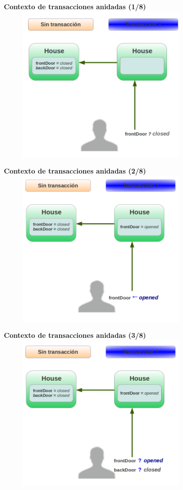 \begin{enumerate}
	{\bf Contexto de transacciones anidadas (1/8)}\\
	\includegraphics[width=400px, height=300px]{img/contextoAninado1}
	
	{\bf Contexto de transacciones anidadas (2/8)}\\
	\includegraphics[width=400px, height=300px]{img/contextoAninado2}
	
	{\bf Contexto de transacciones anidadas (3/8)}\\
	\includegraphics[width=400px, height=300px]{img/contextoAninado3}
	

\end{enumerate}
